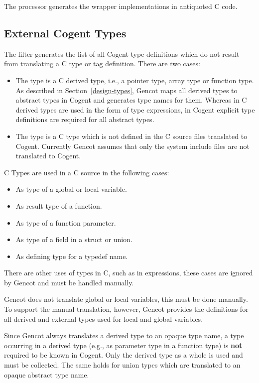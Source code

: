 The processor  generates the wrapper implementations in antiquoted C code.

\subsection{External Cogent Types}
\label{impl-comps-exttypes}

The filter  generates the list of all Cogent type definitions which do not result from
translating a C type or tag definition. There are two cases:
\begin{itemize}
\item The type is a C derived type, i.e., a pointer type, array type or function type. As described in 
Section~\ref{design-types}, Gencot maps all derived types to abstract types in Cogent and generates type names for
them. Whereas in C derived types are used in the form of type expressions, in Cogent explicit type definitions are
required for all abstract types.
\item The type is a C type which is not defined in the C source files translated to Cogent. Currently Gencot assumes
that only the system include files are not translated to Cogent. 
\end{itemize}

C Types are used in a C source in the following cases:
\begin{itemize}
\item As type of a global or local variable.
\item As result type of a function.
\item As type of a function parameter.
\item As type of a field in a struct or union.
\item As defining type for a typedef name.
\end{itemize}
There are other uses of types in C, such as in  expressions, these cases are ignored by Gencot and 
must be handled manually.

Gencot does not translate global or local variables, this must be done manually. To support the manual translation, 
however, Gencot provides the definitions for all derived and external types used for local and global variables.

Since Gencot always translates a derived type to an opaque type name, a type occurring in a derived type (e.g.,
as parameter type in a function type) is \textbf{not} required to be known in Cogent. Only the derived type
as a whole is used and must be collected. The same holds for union types which are translated to an opaque
abstract type name.

